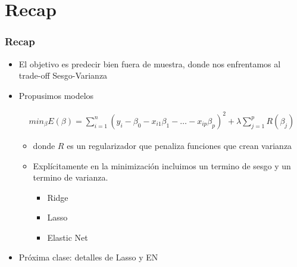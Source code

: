 \documentclass[
  shownotes,
  xcolor={svgnames},
  hyperref={colorlinks,citecolor=DarkBlue,linkcolor=andesred,urlcolor=DarkBlue}
  , aspectratio=169]{beamer}
\begin{document}
\section{Recap}
\begin{frame}[fragile]
\frametitle{Recap}

\begin{itemize}

    \item El objetivo es predecir bien fuera de muestra, donde nos enfrentamos al trade-off Sesgo-Varianza
    
    \medskip
    \item Propusimos modelos


    \begin{align}
        min_{\beta} E(\beta) = \sum_{i=1}^n (y_i-\beta_0 - x_{i1}\beta_1 - \dots - x_{ip}\beta_p)^2 + \lambda \sum_{j=1}^p R(\beta_j)
    \end{align}
    \begin{itemize}
    \item donde $R$ es un regularizador que penaliza funciones que crean varianza
    \medskip
    \item Explícitamente en la minimización incluimos un termino de sesgo y un termino de varianza.


    \medskip
        \begin{itemize}
            \item Ridge
            \medskip
            \item Lasso
            \medskip
            \item Elastic Net
        \end{itemize}
\end{itemize}

  
    \item Próxima clase: detalles de Lasso y EN
 
\end{itemize}
 

 \end{frame}


\end{document}
